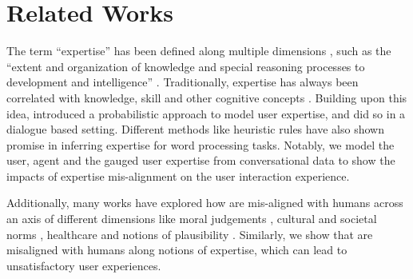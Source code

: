 \section{Related Works}
The term ``expertise'' has been defined along multiple dimensions \cite{bourne2014expertise, garrett2009six}, such as the ``extent and organization of knowledge and special reasoning processes to development and intelligence'' \cite{feltovich1997expertise}. Traditionally, expertise has always been correlated with knowledge, skill and other cognitive concepts \cite{bourne2014expertise}. Building upon this idea, \citet{desmarais1995user} introduced a probabilistic approach to model user expertise, and \citet{dialogue_expertise} did so in a dialogue based setting. Different methods like heuristic rules \cite{vaubel1990inferring} have also shown promise in inferring expertise for word processing tasks. Notably, we model the user, agent and the gauged user expertise from conversational data to show the impacts of expertise mis-alignment on the user interaction experience. 

Additionally, many works have explored how  are mis-aligned with humans across an axis of different dimensions like moral judgements \cite{hendrycks2023aligningaisharedhuman, jiang2022machineslearnmoralitydelphi}, cultural and societal norms \cite{palta-rudinger-2023-fork, acquaye-etal-2024-susu, naous2024havingbeerprayermeasuring, bhatia-shwartz-2023-gd, huang-yang-2023-culturally}, healthcare \cite{levy-etal-2024-evaluating} and notions of plausibility \cite{palta-etal-2024-plausibly}. Similarly, we show that  are misaligned with humans along notions of expertise, which can lead to unsatisfactory user experiences. 